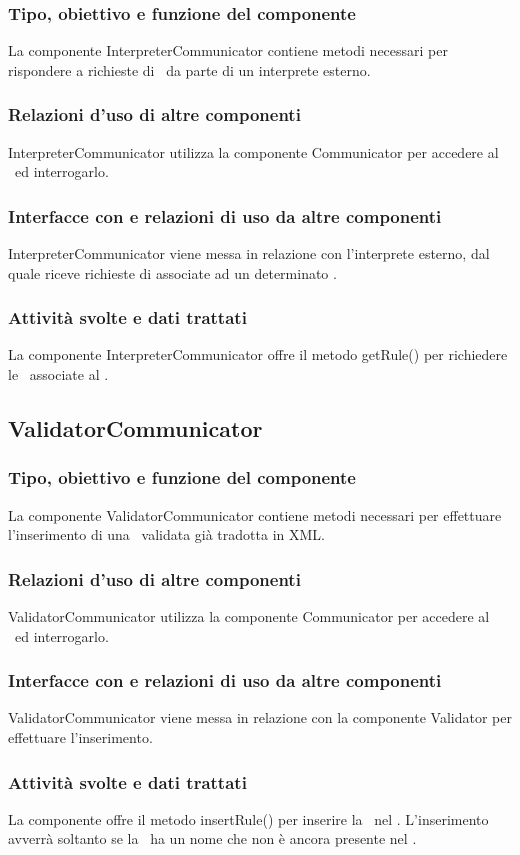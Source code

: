 \documentclass[11pt,titlepage,a4paper]{report}
\begin{document}
\subsubsection{Tipo, obiettivo e funzione del componente}
La componente InterpreterCommunicator contiene metodi necessari per rispondere a richieste di \br\ da parte di un interprete esterno.
\subsubsection{Relazioni d'uso di altre componenti}
InterpreterCommunicator utilizza la componente Communicator per accedere al \re\ ed interrogarlo.
\subsubsection{Interfacce con e relazioni di uso da altre componenti}
InterpreterCommunicator viene messa in relazione con l'interprete esterno, dal quale riceve richieste di \brs associate ad un determinato \bo.
\subsubsection{Attivit\`a svolte e dati trattati}
La componente InterpreterCommunicator offre il metodo getRule() per richiedere le \br\ associate al \bo.

\subsection{ValidatorCommunicator}
\subsubsection{Tipo, obiettivo e funzione del componente}
La componente ValidatorCommunicator contiene metodi necessari per effettuare l'inserimento di una \br\ validata gi\`a tradotta in XML.
\subsubsection{Relazioni d'uso di altre componenti}
ValidatorCommunicator utilizza la componente Communicator per accedere al \re\ ed interrogarlo.
\subsubsection{Interfacce con e relazioni di uso da altre componenti}
ValidatorCommunicator viene messa in relazione con la componente Validator per effettuare l'inserimento.
\subsubsection{Attivit\`a svolte e dati trattati}
La componente offre il metodo insertRule() per inserire la \br\ nel \re. L'inserimento avverr\`a soltanto se la \br\ ha un nome che non \`e ancora presente nel \re.
\end{document}
